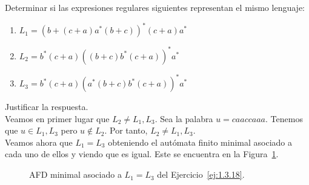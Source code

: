 \begin{ejercicio}\label{ej:1.3.18}
    Determinar si las expresiones regulares siguientes representan el mismo lenguaje:
    \begin{enumerate}
        \item $L_1={(b+(c+a)a^\ast (b+c))}^{\ast} (c+a)a^\ast$
        \item $L_2=b^\ast (c+a) {((b+c)b^\ast (c+a))}^{\ast}a^\ast$
        \item $L_3=b^\ast (c+a){(a^\ast (b+c)b^\ast (c+a))}^{\ast}a^\ast$
    \end{enumerate}
    Justificar la respuesta.\\

    Veamos en primer lugar que $L_2\neq L_1,L_3$. Sea la palabra $u=caaccaaa$.
    Tenemos que $u\in L_1, L_3$ pero $u\notin L_2$. Por tanto, $L_2\neq L_1, L_3$.\\

    Veamos ahora que $L_1=L_3$ obteniendo el autómata finito minimal asociado a cada uno de ellos y viendo que es igual. Este se encuentra en la Figura~\ref{fig:1.3.18-L1-L3}.
    \begin{figure}
        \centering
        \caption{AFD minimal asociado a $L_1=L_3$ del Ejercicio~\ref{ej:1.3.18}.}
        \label{fig:1.3.18-L1-L3}
    \end{figure}
\end{ejercicio}

